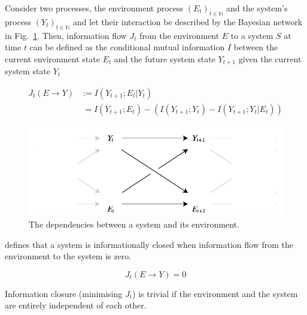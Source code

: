 \documentclass[utf8]{article}
\begin{document}
			Consider two processes, the environment process $(E_t)_{t \in \mathbb{N}}$ and the system's process $(Y_t)_{t \in \mathbb{N}}$ and let their interaction be described by the Bayesian network in Fig.~\ref{fig:SystemAndEnv}. Then, information flow $J_{t}$ from the environment $E$ to a system $S$ at time $t$ can be defined as the conditional mutual information $I$ between the current environment state $E_{t}$  and the future system state $Y_{t+1}$ given the current system state $Y_{t}$

				\begin{equation}
    				\label{eq:InformationFlow}
    				\left.\begin{array}
    				{rl}{J_{t}(E \rightarrow Y )} & {:= I(Y_{t+1};E_{t}|Y_{t})} \\
    				{ } & { \ = I(Y_{t+1};E_{t}) - (I(Y_{t+1};Y_{t})-I(Y_{t+1};Y_{t}|E_{t}))}
    				\end{array}\right.
				\end{equation}

            
				\begin{figure}
					\includegraphics[width=\textwidth]{WritingMaterials/Fig_SystemAndEnv/SystemAndEnv_2.pdf}
					\caption{The dependencies between a system and its environment.} %
					\label{fig:SystemAndEnv}
				\end{figure}


			\noindent
			\cite{BERTSCHINGER.2006} defines that a system is informationally closed when information flow from the environment to the system is zero.

				\begin{equation}
				J_{t}(E \rightarrow Y )=0
				\label{eq:informationflow2}
				\end{equation}


			\noindent
			Information closure (minimising $J_t$) is trivial if the environment and the system are entirely independent of each other.
\end{document}
